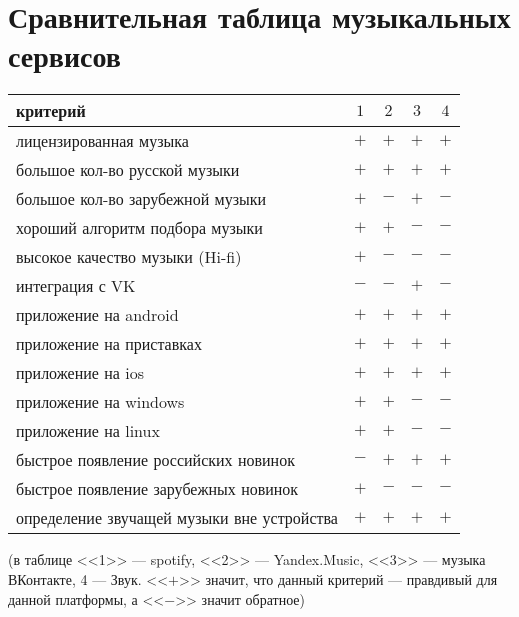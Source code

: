 \chapter{Сравнительная таблица музыкальных сервисов}

\begin{tabular}{l|>{$}c<{$}>{$}c<{$}>{$}c<{$}>{$}c<{$}}
  критерий                                   & 1 & 2 & 3 & 4\\
  \hline
  лицензированная музыка                     & + & + & + & +\\
  большое кол-во русской музыки              & + & + & + & +\\
  большое кол-во зарубежной музыки           & + & - & + & -\\
  хороший алгоритм подбора музыки            & + & + & - & -\\
  высокое качество музыки (Hi-fi)            & + & - & - & -\\
  интеграция с VK                            & - & - & + & -\\
  приложение на android                      & + & + & + & +\\
  приложение на приставках                   & + & + & + & +\\
  приложение на ios                          & + & + & + & +\\
  приложение на windows                      & + & + & - & -\\
  приложение на linux                        & + & + & - & -\\
  быстрое появление российских новинок       & - & + & + & +\\
  быстрое появление зарубежных новинок       & + & - & - & -\\
  определение звучащей музыки вне устройства & + & + & + & +\\
\end{tabular}

\vspace{1em}

(в таблице <<1>> --- spotify, <<2>> --- Yandex.Music, <<3>> --- музыка
ВКонтакте, 4 --- Звук.  <<$+$>> значит, что данный критерий --- правдивый
для данной платформы, а <<$-$>> значит обратное)

